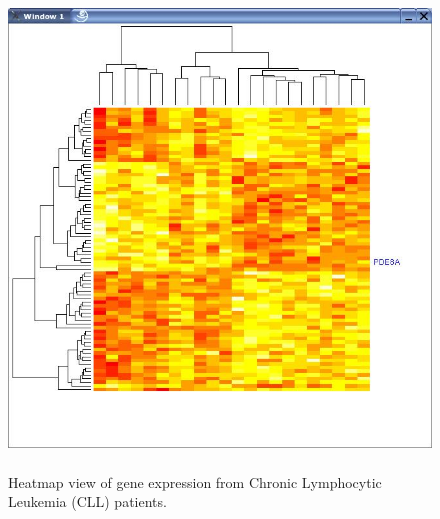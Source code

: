 \documentclass{article}[11pt]
\begin{document}
\begin{figure}[ht]
  \begin{center}
    \includegraphics[height=5in, width=5in]{heatmap.jpg}
    \caption{ Heatmap view of gene expression from Chronic Lymphocytic
      Leukemia (CLL) patients. }
    \label{Fig:heatmap}
  \end{center}
\end{figure}
\end{document}
